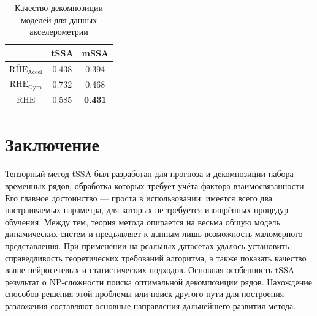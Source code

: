 			\def\arraystretch{1.2}
			\begin{table}[h!]
				\centering
				\caption{Качество декомпозиции моделей для данных акселерометрии}\label{tab:decomp_motion_results}
				\begin{tabular}{|c|c|c|}
					\hline
					& tSSA  & mSSA           \\ \hline
					$ \overline{\text{RHE}}_{\text{Accel}} $   & 0.438 & 0.394          \\ \hline
					$ \overline{\text{RHE}}_{\text{Gyro}} $ & 0.732 & 0.468          \\ \hline
					$ \overline{\text{RHE}} $         & 0.585 & \textbf{0.431} \\ \hline
				\end{tabular}
			\end{table}		
			
		\section{Заключение}
		
		Тензорный метод tSSA был разработан для прогноза и декомпозиции набора временных рядов, обработка которых требует учёта фактора взаимосвязанности. Его главное достоинство --- проста в использовании: имеется всего два настраиваемых параметра, для которых не требуется изощрённых процедур обучения. Между тем, теория метода опирается на весьма общую модель динамических систем и предъявляет к данным лишь возможность маломерного представления. При применении на реальных датасетах удалось установить справедливость теоретических требований алгоритма, а также показать качество выше нейросетевых и статистических подходов. Основная особенность tSSA --- результат о NP-сложности поиска оптимальной декомпозиции рядов. Нахождение способов решения этой проблемы или поиск другого пути для построения разложения составляют основные направления дальнейшего развития метода.
		
		\clearpage
		\printbibliography
	
